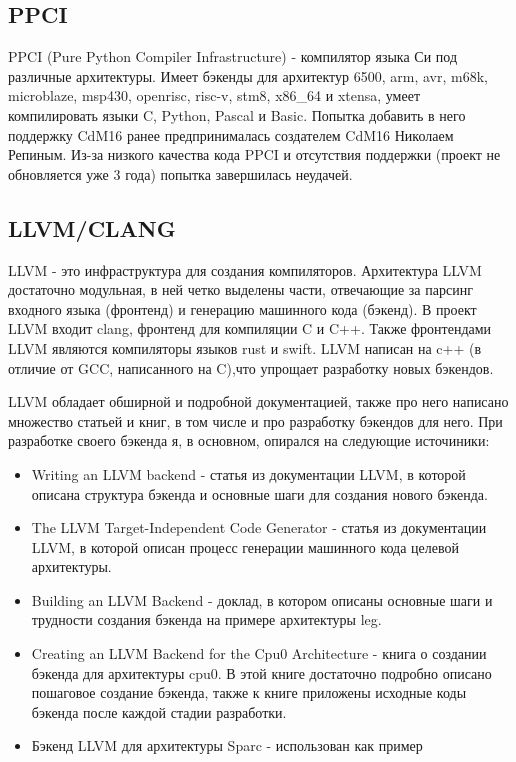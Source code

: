 \documentclass[a4paper,14pt]{extarticle}
\begin{document}
\subsection{PPCI}

PPCI (Pure Python Compiler Infrastructure)\cite{ppci} - компилятор языка Си под различные архитектуры. Имеет бэкенды для архитектур 6500, arm, avr, m68k, microblaze, msp430, openrisc, risc-v, stm8, x86\_64 и xtensa, умеет компилировать языки C, Python, Pascal и Basic.   Попытка добавить в него поддержку CdM16 ранее предпринималась создателем CdM16 Николаем Репиным. Из-за низкого качества кода PPCI и отсутствия поддержки (проект не обновляется уже 3 года) попытка завершилась неудачей.

\subsection{LLVM/CLANG}
LLVM - это инфраструктура для создания компиляторов.  Архитектура LLVM достаточно модульная, в ней четко выделены части, отвечающие за парсинг входного языка (фронтенд) и генерацию машинного кода (бэкенд). В проект LLVM входит  clang, фронтенд для компиляции C и C++. Также фронтендами LLVM являются компиляторы языков rust и swift. LLVM написан на c++ (в отличие от GCC, написанного на C),что упрощает разработку новых бэкендов.

LLVM обладает обширной и подробной документацией, также про него написано множество статьей и книг, в том числе и про разработку бэкендов для него. При разработке своего бэкенда я, в основном, опирался на следующие источиники:
\begin{itemize}
	\item Writing an LLVM backend\cite{llvm:writing_backend} - статья из документации LLVM, в которой описана структура бэкенда и основные шаги для создания нового бэкенда.
	\item The LLVM Target-Independent Code Generator\cite{llvm:codegen} - статья из документации LLVM, в которой описан процесс генерации машинного кода целевой архитектуры.
	\item Building an LLVM Backend\cite{llvmleg} - доклад, в котором описаны основные шаги и трудности создания бэкенда на примере архитектуры leg.
	\item Creating an LLVM Backend for the Cpu0 Architecture\cite{cpu0} - книга о создании бэкенда для архитектуры cpu0. В этой книге достаточно подробно описано пошаговое создание бэкенда, также к книге приложены исходные коды бэкенда после каждой стадии разработки.
	\item Бэкенд LLVM для архитектуры Sparc\cite{llvm:sparc} - использован как пример
\end{itemize}
\end{document}
